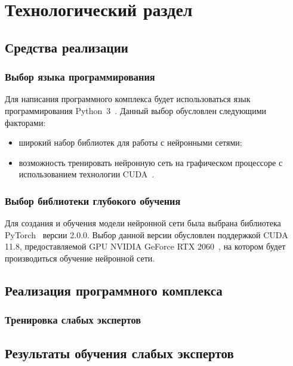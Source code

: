 \chapter{Технологический раздел}

\section{Средства реализации}

\subsection{Выбор языка программирования}

Для написания программного комплекса будет использоваться язык программирования Python~3~\cite{python3}. Данный выбор обусловлен следующими факторами:
\begin{itemize}[label=---]
    \item широкий набор библиотек для работы с нейронными сетями;
    \item возможность тренировать нейронную сеть на графическом процессоре с
использованием технологии CUDA~\cite{cuda}.
\end{itemize}

\subsection{Выбор библиотеки глубокого обучения}

Для создания и обучения модели нейронной сети была выбрана библиотека PyTorch~\cite{pytorch} версии 2.0.0. Выбор данной версии обусловлен поддержкой CUDA 11.8, предоставляемой GPU NVIDIA GeForce RTX 2060~\cite{rtx2060}, на котором будет производиться обучение нейронной сети.

\section{Реализация программного комплекса}

\subsection{Тренировка слабых экспертов}

\section{Результаты обучения слабых экспертов}


